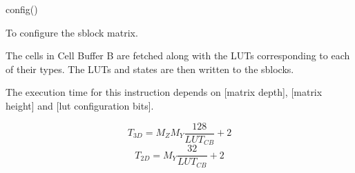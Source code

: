 

\format

config()

\purpose

To configure the sblock matrix.

\description

The cells in Cell Buffer B are fetched along with the LUTs corresponding to each of their types.
The LUTs and states are then written to the sblocks.

\notes

The execution time for this instruction depends on [matrix depth], [matrix height] and [lut configuration bits].

$$ T_{3D} = M_Z M_Y \frac{ 128 }{ LUT_{CB} } + 2 $$
$$ T_{2D} = M_Y \frac{ 32 }{ LUT_{CB} } + 2 $$
